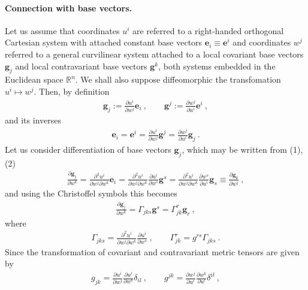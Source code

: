 \documentclass[12pt]{article}
\begin{document}
\paragraph{Connection with base vectors.} 

Let us assume that coordinates $u^i$ are referred to a right-handed orthogonal Cartesian system with attached constant base vectors $\mathbf{e}_i\equiv\mathbf{e}^i$ and coordinates $w^j$ referred to a general curvilinear system attached to a local covariant base vectors $\mathbf{g}_j$ and local contravariant base vectors $\mathbf{g}^k$, both systems embedded in the Euclidean space $\mathbb{R}^n$. We shall also suppose diffeomorphic the transfomation $u^i\mapsto w^j$. Then, by definition 
\begin{align}
\mathbf{g}_j:=\frac{\partial u^i}{\partial w^j}\mathbf{e}_i\:, \qquad
\mathbf{g}^j:=\frac{\partial w^j}{\partial u^i}\mathbf{e}^i\:,
\end{align}
and its inverses
\begin{align}
\mathbf{e}_i=\mathbf{e}^i=\frac{\partial u^i}{\partial w^j}\mathbf{g}^j=
\frac{\partial w^j}{\partial u^i}\mathbf{g}_j\:.
\end{align}
Let us consider differentiation of base vectors $\mathbf{g}_j$, which may be written from (1),(2)
\begin{align*}
\frac{\partial\mathbf{g}_j}{\partial w^k}=
\frac{\partial^2 u^i}{\partial w^j\partial w^k}\mathbf{e}_i=
\frac{\partial^2 u^i}{\partial w^j\partial w^k}
\frac{\partial u^i}{\partial w^s}\mathbf{g}^s=
\frac{\partial^2 u^i}{\partial w^j\partial w^k}
\frac{\partial w^s}{\partial u^i}\mathbf{g}_s\equiv
\frac{\partial\mathbf{g}_k}{\partial w^j}\:,
\end{align*}
and using the Christoffel symbols this becomes
\begin{align}
\frac{\partial\mathbf{g}_j}{\partial w^k}=\Gamma_{jks}\mathbf{g}^s=
\Gamma^r_{jk}\mathbf{g}_r\:,
\end{align}
where
\begin{align}
\Gamma_{jks}=\frac{\partial^2 u^i}{\partial w^j\partial w^k}
\frac{\partial u^i}{\partial w^s}\:, \qquad \Gamma^r_{jk}=g^{rs}\Gamma_{jks}\:.
\end{align}
Since the transformation of covariant and contravariant metric tensors are given by
\begin{align*}
g_{jk}=\frac{\partial u^i}{\partial w^j}\frac{\partial u^l}{\partial w^k}\delta_{il}\:,
\qquad g^{jk}=\frac{\partial w^j}{\partial u^i}
\frac{\partial w^k}{\partial u^l}\delta^{il}\:,
\end{align*}
\end{document}
